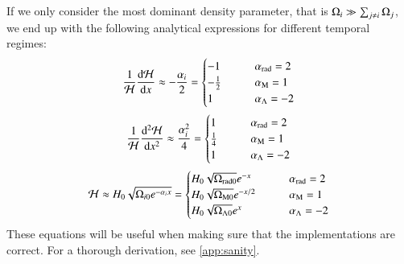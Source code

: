     If we only consider the most dominant density parameter, that is $\Omega_i \gg \sum_{j\neq i}\Omega_j$, we end up with the following analytical expressions for different temporal regimes:
    \begin{equation}
        \label{eq:m1:theory:sanity:first_deriv_sanity}
        \frac{1}{\mathcal{H}}\dv{\mathcal{H}}{x} \approx - \frac{\alpha_i}{2} = 
        \begin{cases}
            -1 \qquad &\alpha_\mathrm{rad} = 2 \\
            -\frac{1}{2} \qquad &\alpha_\mathrm{M} = 1\\
            1 \qquad &\alpha_\Lambda = -2
        \end{cases}
    \end{equation}
    \begin{equation}
        \label{eq:m1:theory:sanity:second_deriv_sanity}
        \frac{1}{\mathcal{H}}\dv[2]{\mathcal{H}}{x} \approx \frac{\alpha_i^2}{4} = 
        \begin{cases}
            1 \qquad &\alpha_\mathrm{rad} = 2 \\
            \frac{1}{4} \qquad &\alpha_\mathrm{M} = 1\\
            1 \qquad &\alpha_\Lambda = -2
        \end{cases}
    \end{equation}
    \begin{equation}
        \label{eq:m1:theory:sanity:conformal_hubble}
        \mathcal{H} \approx H_0\sqrt{\Omega_{i0}e^{-\alpha_ix}} = 
        \begin{cases}
            H_0\sqrt{\Omega_\mathrm{rad0}}e^{-x} \qquad &\alpha_\mathrm{rad} = 2 \\
            H_0\sqrt{\Omega_\mathrm{M0}}e^{-x/2} \qquad &\alpha_\mathrm{M} = 1\\
            H_0\sqrt{\Omega_{\Lambda0}}e^x \qquad &\alpha_\Lambda = -2
        \end{cases}
    \end{equation}
    These equations will be useful when making sure that the implementations are correct.
    For a thorough derivation, see \cref{app:sanity}.



